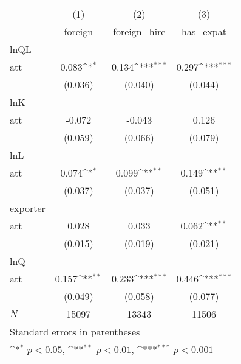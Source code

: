 {
\def\sym#1{\ifmmode^{#1}\else\(^{#1}\)\fi}
\begin{tabular}{l*{3}{c}}
\hline\hline
            &\multicolumn{1}{c}{(1)}&\multicolumn{1}{c}{(2)}&\multicolumn{1}{c}{(3)}\\
            &\multicolumn{1}{c}{ foreign}&\multicolumn{1}{c}{ foreign\_hire}&\multicolumn{1}{c}{ has\_expat}\\
\hline
lnQL        &                     &                     &                     \\
att         &       0.083\sym{*}  &       0.134\sym{***}&       0.297\sym{***}\\
            &     (0.036)         &     (0.040)         &     (0.044)         \\
\hline
lnK         &                     &                     &                     \\
att         &      -0.072         &      -0.043         &       0.126         \\
            &     (0.059)         &     (0.066)         &     (0.079)         \\
\hline
lnL         &                     &                     &                     \\
att         &       0.074\sym{*}  &       0.099\sym{**} &       0.149\sym{**} \\
            &     (0.037)         &     (0.037)         &     (0.051)         \\
\hline
exporter    &                     &                     &                     \\
att         &       0.028         &       0.033         &       0.062\sym{**} \\
            &     (0.015)         &     (0.019)         &     (0.021)         \\
\hline
lnQ         &                     &                     &                     \\
att         &       0.157\sym{**} &       0.233\sym{***}&       0.446\sym{***}\\
            &     (0.049)         &     (0.058)         &     (0.077)         \\
\hline
\(N\)       &       15097         &       13343         &       11506         \\
\hline\hline
\multicolumn{4}{l}{\footnotesize Standard errors in parentheses}\\
\multicolumn{4}{l}{\footnotesize \sym{*} \(p<0.05\), \sym{**} \(p<0.01\), \sym{***} \(p<0.001\)}\\
\end{tabular}
}
